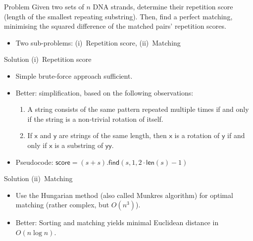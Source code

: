 \begin{slide}
	\begin{block}{Problem}
		Given two sets of $n$ DNA strands, determine their repetition score (length of the smallest repeating substring).
		Then, find a perfect matching, minimising the squared difference of the matched pairs' repetition scores.
	\end{block}
  \pause
	\begin{itemize}
		\item Two sub-problems: (i)~Repetition score, (ii)~Matching
	\end{itemize}
\end{slide}

\begin{slide}
	\begin{block}{Solution (i)~Repetition score}
		\begin{itemize}
			\item Simple brute-force approach sufficient.
			\item Better: simplification, based on the following observations:
			\begin{enumerate}
				\item A string consists of the same pattern repeated multiple times if and only if the string is a non-trivial rotation of itself.
				\item If $\mathsf{x}$ and $\mathsf{y}$ are strings of the same length, then $\mathsf{x}$ is a rotation of $\mathsf{y}$ if and only if $\mathsf{x}$ is a substring of $\mathsf{yy}$.
			\end{enumerate}
			\item Pseudocode: $\mathsf{score} = (s + s).\mathsf{find}(s, 1, 2 \cdot \mathsf{len}(s) - 1)$
		\end{itemize}
	\end{block}
  \pause
	\begin{block}{Solution (ii)~Matching}
		\begin{itemize}
			\item Use the Hungarian method (also called Munkres algorithm) for optimal matching (rather complex, but $O(n^3)$).
			\item Better: Sorting and matching yields minimal Euclidean distance in $O(n \log n)$.
		\end{itemize}
	\end{block}
\end{slide}

